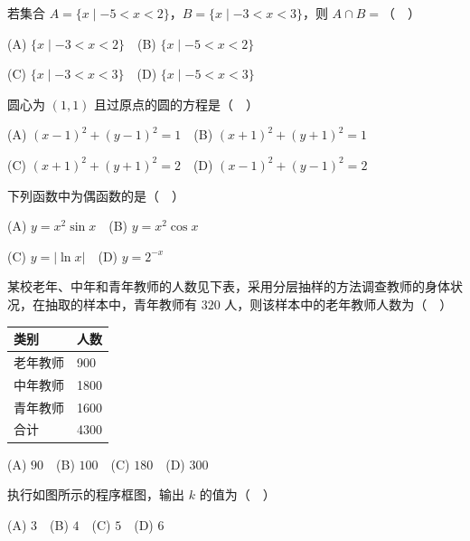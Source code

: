 \begin{question}
若集合 \(A=\{x\mid -5<x<2\}\)，\(B=\{x\mid -3<x<3\}\)，则 \(A\cap B=\)（　）

(A) \(\{x\mid -3<x<2\}\)　(B) \(\{x\mid -5<x<2\}\)

(C) \(\{x\mid -3<x<3\}\)　(D) \(\{x\mid -5<x<3\}\)

\end{question}
\begin{question}
圆心为 \((1,1)\) 且过原点的圆的方程是（　）

(A) \((x-1)^{2}+(y-1)^{2}=1\)　(B) \((x+1)^{2}+(y+1)^{2}=1\)

(C) \((x+1)^{2}+(y+1)^{2}=2\)　(D) \((x-1)^{2}+(y-1)^{2}=2\)

\end{question}
\begin{question}
下列函数中为偶函数的是（　）

(A) \(y=x^{2}\sin x\)　(B) \(y=x^{2}\cos x\)

(C) \(y=|\ln x|\)　(D) \(y=2^{-x}\)

\end{question}
\begin{question}
某校老年、中年和青年教师的人数见下表，采用分层抽样的方法调查教师的身体状况，在抽取的样本中，青年教师有 \(320\) 人，则该样本中的老年教师人数为（　）

\begin{center}
\begin{tabular}{ll}
\toprule
类别 & 人数 \\
\midrule
老年教师 & 900 \\
中年教师 & 1800 \\
青年教师 & 1600 \\
合计 & 4300 \\
\bottomrule
\end{tabular}
\end{center}

(A) \(90\)　(B) \(100\)　(C) \(180\)　(D) \(300\)

\Needspace{0.4\textheight}
\end{question}
\begin{question}
执行如图所示的程序框图，输出 \(k\) 的值为（　）
\nopagebreak[4]
\begin{center}\end{center}
\nopagebreak[4]
(A) \(3\)　(B) \(4\)　(C) \(5\)　(D) \(6\)

\end{question}
